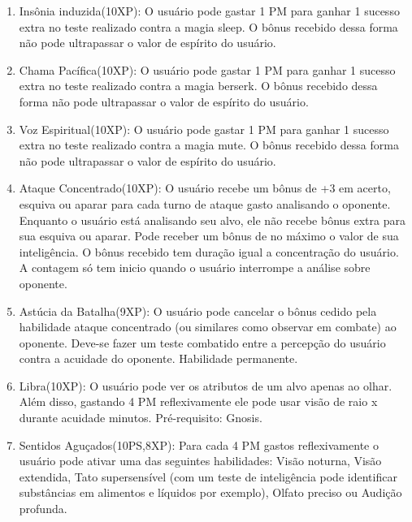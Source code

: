 \begin{enumerate}
	\item Insônia induzida(10XP): O usuário pode gastar 1 PM para ganhar 1 sucesso extra no teste realizado contra a magia sleep. O bônus recebido dessa forma não pode ultrapassar o valor de espírito do usuário.
	
	\item Chama Pacífica(10XP): O usuário pode gastar 1 PM para ganhar 1 sucesso extra no teste realizado contra a magia berserk. O bônus recebido dessa forma não pode ultrapassar o valor de espírito do usuário.
		
	\item Voz Espiritual(10XP): O usuário pode gastar 1 PM para ganhar 1 sucesso extra no teste realizado contra a magia mute. O bônus recebido dessa forma não pode ultrapassar o valor de espírito do usuário.

	\item Ataque Concentrado(10XP): O usuário recebe um bônus de +3 em acerto, esquiva ou aparar para cada turno de ataque gasto analisando o oponente. Enquanto o usuário está analisando seu alvo, ele não recebe bônus extra para sua esquiva ou aparar. Pode receber um bônus de no máximo o valor de sua inteligência. O bônus recebido tem duração igual a concentração do usuário. A contagem só tem inicio quando o usuário interrompe a análise sobre oponente.

	\item Astúcia da Batalha(9XP): O usuário pode cancelar o bônus cedido pela habilidade ataque concentrado (ou similares como observar em combate) ao oponente. Deve-se fazer um teste combatido entre a percepção do usuário contra a acuidade do oponente. Habilidade permanente.
	

	\item Libra(10XP): O usuário pode ver os atributos de um alvo apenas ao olhar. Além disso, gastando 4 PM reflexivamente ele pode usar visão de raio x durante acuidade minutos. Pré-requisito: Gnosis.
	
	\item Sentidos Aguçados(10PS,8XP): Para cada 4 PM gastos reflexivamente o usuário pode ativar uma das seguintes habilidades: Visão noturna, Visão extendida, Tato supersensível (com um teste de inteligência pode identificar substâncias em alimentos e líquidos por exemplo), Olfato preciso ou Audição profunda.


\end{enumerate}
